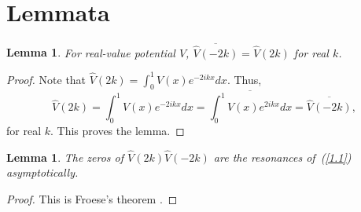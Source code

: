\documentclass[10pt,a4paper]{article}
\theoremstyle{plain}
\newtheorem{lemma}[theorem]{Lemma}
\theoremstyle{definition}
\theoremstyle{remark}
\numberwithin{equation}{section}
\begin{document}
\section{Lemmata}
\begin{lemma}
For real-value potential $V$, $\overline{\widehat{V}(-2k)}=\widehat{V}(2k)$ for real $k$.
\end{lemma}
\begin{proof}
Note that $\widehat{V}(2k)=\int_{0}^{1}V(x)e^{{-2ikx}}dx$. Thus, $$\widehat{V}(2k)=\int_{0}^{1}V(x)e^{{-2ikx}}dx=\overline{\int_{0}^{1}V(x)e^{{2ikx}}dx}=\overline{\widehat{V}(-2k)},$$for real $k$. This proves the lemma.
\end{proof}
\begin{lemma}\label{Froese}
The zeros of $\widehat{V}(2k)\widehat{V}(-2k)$ are the resonances of~(\ref{1.1}) asymptotically. 
\end{lemma}
\begin{proof}
This is Froese's theorem \cite[Theorem\,1.3]{Froese}.
\end{proof}
\end{document}
